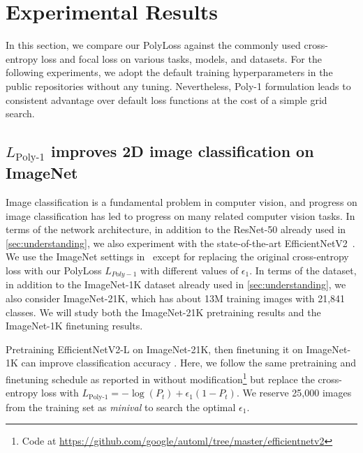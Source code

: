 \vspace{-5pt}
\section{Experimental Results}
\vspace{-5pt}

In this section, we compare our PolyLoss against the commonly used cross-entropy loss and focal loss on various tasks, models, and datasets. For the following experiments, we adopt the default training hyperparameters in the public repositories without any tuning. Nevertheless, Poly-1 formulation leads to consistent advantage over default loss functions at the cost of a simple grid search.

\vspace{-5pt}
\subsection{\texorpdfstring{$L_{\text{Poly-1}}$}{} improves 2D image classification on ImageNet}
\vspace{-5pt}

Image classification is a fundamental problem in computer vision, and progress on image classification has led to progress on many related computer vision tasks. 
In terms of the network architecture, in addition to the ResNet-50 already used in \autoref{sec:understanding}, we also experiment with the state-of-the-art EfficientNetV2~\citep{tan2021efficientnetv2}. 
We use the ImageNet settings in~\citep{tan2021efficientnetv2} except for replacing the original cross-entropy loss with our PolyLoss $L_{Poly-1}$ with different values of $\epsilon_1$.
In terms of the dataset, in addition to the ImageNet-1K dataset already used in \autoref{sec:understanding}, we also consider ImageNet-21K, which has about 13M training images with 21,841 classes. We will study both the ImageNet-21K pretraining results and the ImageNet-1K finetuning results.





Pretraining EfficientNetV2-L on ImageNet-21K, then finetuning it on ImageNet-1K can improve classification accuracy \citep{tan2021efficientnetv2}. Here, we follow the same pretraining and finetuning schedule as reported in \citet{tan2021efficientnetv2} without modification\footnote{\label{note:enet} Code at \url{https://github.com/google/automl/tree/master/efficientnetv2}} but replace the cross-entropy loss with $L_{\text{Poly-1}}= -\log(P_t) + \epsilon_1 (1-P_t)$. We reserve 25,000 images from the training set as \textit{minival} to search the optimal $\epsilon_1$.

